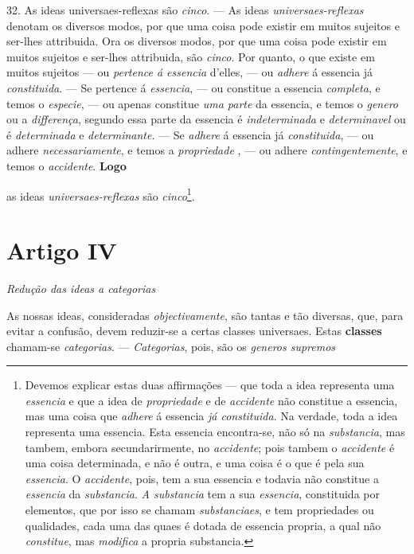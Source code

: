32. As ideas universaes-reflexas são \emph{cinco}. --- As ideas \emph{universaes-reflexas} denotam os diversos modos, por que uma coisa pode existir em muitos sujeitos e ser-lhes attribuida. Ora os diversos modos, por que uma coisa pode existir em muitos sujeitos e ser-lhes attribuida, são \emph{cinco}. Por quanto, o que existe em muitos sujeitos --- ou \emph{pertence á essencia} d'elles, --- ou \emph{adhere} á essencia já \emph{constituida}. --- Se pertence á \emph{essencia}, --- ou constitue a essencia \emph{completa}, e temos o \emph{especie}, --- ou apenas constitue \emph{uma parte} da essencia, e temos o \emph{genero} ou a \emph{differença}, segundo essa parte da essencia é \emph{indeterminada} e \emph{determinavel} ou é \emph{determinada} e \emph{determinante}. --- Se \emph{adhere} á essencia já \emph{constituida}, --- ou adhere \emph{necessariamente}, e temos a \emph{propriedade}  , --- ou adhere \emph{contingentemente}, e temos o \emph{accidente}. \textbf{Logo}

as ideas \emph{universaes-reflexas} são \emph{cinco}\footnote{Devemos explicar estas duas affirmações --- que toda a idea representa uma \emph{essencia} e que a idea de \emph{propriedade} e de \emph{accidente} não constitue a essencia, mas uma coisa que \emph{adhere} á essencia \emph{já constituida}. Na verdade, toda a idea representa uma essencia. Esta essencia encontra-se, não só na \emph{substancia}, mas tambem, embora secundarirmente, no \emph{accidente}; pois tambem o \emph{accidente} é uma coisa determinada, e não é outra, e uma coisa é o que é pela sua \emph{essencia}. O \emph{accidente}, pois, tem a sua essencia e todavia não constitue a \emph{essencia} da \emph{substancia}. \emph{A substancia} tem a sua \emph{essencia}, constituida por elementos, que por isso se chamam \emph{substanciaes}, e tem propriedades ou qualidades, cada uma das quaes é dotada de essencia propria, a qual não \emph{constitue}, mas \emph{modifica} a propria substancia.}.


\section*{Artigo IV}

\emph{Redução das ideas a categorias}


As nossas ideas, consideradas \emph{objectivamente}, são tantas e tão diversas, que, para evitar a confusão, devem reduzir-se a certas classes universaes. Estas \textbf{classes} chamam-se \emph{categorias}. --- \emph{Categorias}, pois, são os \emph{generos supremos}

